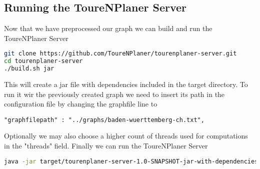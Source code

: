 \documentclass[titlepage,parskip=true]{scrartcl}
\begin{document}
\subsection{Running the ToureNPlaner Server}
Now that we have preprocessed our graph we can build and run the ToureNPlaner Server
\begin{lstlisting}[language=bash]
git clone https://github.com/ToureNPlaner/tourenplaner-server.git
cd tourenplaner-server 
./build.sh jar
\end{lstlisting}
This will create a jar file with dependencies included in the target directory. To run it
wir the previously created graph we need to insert its path in the configuration file by changing
the graphfile line to
\begin{verbatim}
"graphfilepath" : "../graphs/baden-wuerttemberg-ch.txt",
\end{verbatim}
Optionally we may also choose a higher count of threads used for computations
in the "threads" field.  Finally we can run the ToureNPlaner Server
\begin{lstlisting}[language=bash]
java -jar target/tourenplaner-server-1.0-SNAPSHOT-jar-with-dependencies.jar -c tourenplaner.conf
\end{lstlisting}
\end{document}
